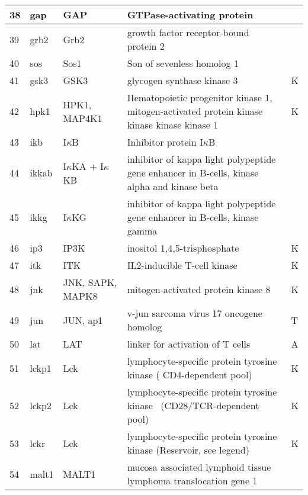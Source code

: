 \documentclass[a4paper, 12pt,epsfig, onecolumn]{article}
\begin{document}
{\begin{longtable}{|p{}|p{}|p{}|p{}|p{}|}
\hline
        38 &      gap   &        GAP & GTPase-activating protein &            \\
\hline
        39 &       grb2 &       Grb2 & growth factor receptor-bound protein 2  &            \\
\hline
        40 &        sos &       Sos1 & Son of sevenless homolog 1 &            \\
\hline
        41 &    gsk3    &       GSK3 & glycogen synthase kinase 3 &         K  \\
\hline
        42 &  hpk1      & HPK1, MAP4K1 & Hematopoietic progenitor kinase 1, mitogen-activated protein kinase kinase kinase kinase 1   &         K  \\
\hline
        43 &   ikb      &        I$\kappa$B & Inhibitor protein I$\kappa$B &            \\
\hline
        44 &      ikkab & I$\kappa$KA + I$\kappa$KB & inhibitor of kappa light polypeptide gene enhancer in B-cells, kinase alpha and kinase beta &            \\
\hline
        45 &     ikkg   &       I$\kappa$KG & inhibitor of kappa light polypeptide gene enhancer in B-cells, kinase gamma    &            \\
\hline
        46 &    ip3     &       IP3K & inositol 1,4,5-trisphosphate   &          K \\
\hline
        47 &   itk      &        ITK & IL2-inducible T-cell kinase &         K  \\
\hline
        48 &    jnk     & JNK, SAPK, MAPK8 & mitogen-activated protein kinase 8  &          K \\
\hline
        49 &      jun   &  JUN, ap1  & v-jun sarcoma virus 17 oncogene homolog &         T  \\
\hline
        50 &     lat    &        LAT & linker for activation of T cells &         A  \\
\hline
        51 &    lckp1   &        Lck & lymphocyte-specific protein tyrosine kinase ( CD4-dependent pool)    &          K \\
\hline
        52 &    lckp2   &        Lck & lymphocyte-specific protein tyrosine kinase  (CD28/TCR-dependent pool) &          K \\
\hline
        53 &     lckr   &        Lck & lymphocyte-specific protein tyrosine kinase (Reservoir, see legend)    &          K \\
\hline
        54 &     malt1  &      MALT1 & mucosa associated lymphoid tissue lymphoma translocation gene 1    &            \\

\end{longtable}}
\end{document}
